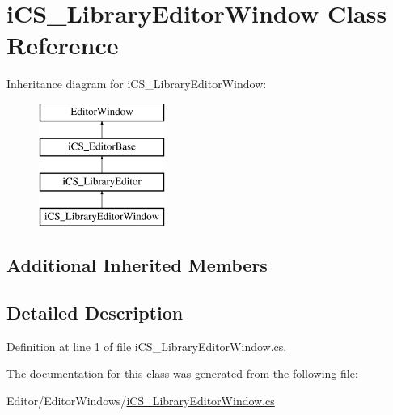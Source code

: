 \hypertarget{classi_c_s___library_editor_window}{\section{i\+C\+S\+\_\+\+Library\+Editor\+Window Class Reference}
\label{classi_c_s___library_editor_window}
}
Inheritance diagram for i\+C\+S\+\_\+\+Library\+Editor\+Window\+:\begin{figure}[H]
\begin{center}
\leavevmode
\includegraphics[height=4.000000cm]{classi_c_s___library_editor_window}
\end{center}
\end{figure}
\subsection*{Additional Inherited Members}


\subsection{Detailed Description}


Definition at line 1 of file i\+C\+S\+\_\+\+Library\+Editor\+Window.\+cs.



The documentation for this class was generated from the following file\+:\begin{DoxyCompactItemize}
\item 
Editor/\+Editor\+Windows/\hyperlink{i_c_s___library_editor_window_8cs}{i\+C\+S\+\_\+\+Library\+Editor\+Window.\+cs}\end{DoxyCompactItemize}
